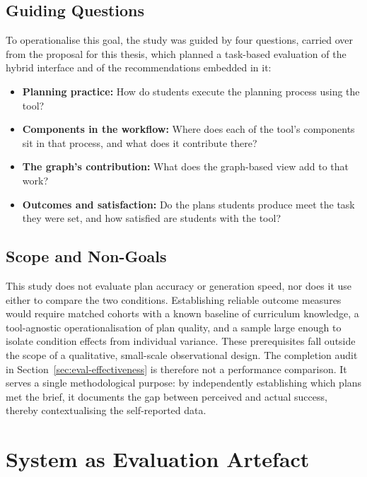 \subsection{Guiding Questions}
\label{sec:eval-guiding}

To operationalise this goal, the study was guided by four questions, carried over from the proposal for this thesis, which planned a task-based evaluation of the hybrid interface and of the recommendations embedded in it:

\begin{itemize}
    \item \textbf{Planning practice:} How do students execute the planning process using the tool?
    \item \textbf{Components in the workflow:} Where does each of the tool's components sit in that process, and what does it contribute there?
    \item \textbf{The graph's contribution:} What does the graph-based view add to that work?
    \item \textbf{Outcomes and satisfaction:} Do the plans students produce meet the task they were set, and how satisfied are students with the tool?
\end{itemize}

\subsection{Scope and Non-Goals}
\label{sec:eval-nongoals}

This study does not evaluate plan accuracy or generation speed, nor does it use either to compare the two conditions. Establishing reliable outcome measures would require matched cohorts with a known baseline of curriculum knowledge, a tool-agnostic operationalisation of plan quality, and a sample large enough to isolate condition effects from individual variance. These prerequisites fall outside the scope of a qualitative, small-scale observational design. The completion audit in Section~\ref{sec:eval-effectiveness} is therefore not a performance comparison. It serves a single methodological purpose: by independently establishing which plans met the brief, it documents the gap between perceived and actual success, thereby contextualising the self-reported data.

\section{System as Evaluation Artefact}
\label{sec:eval-system}

